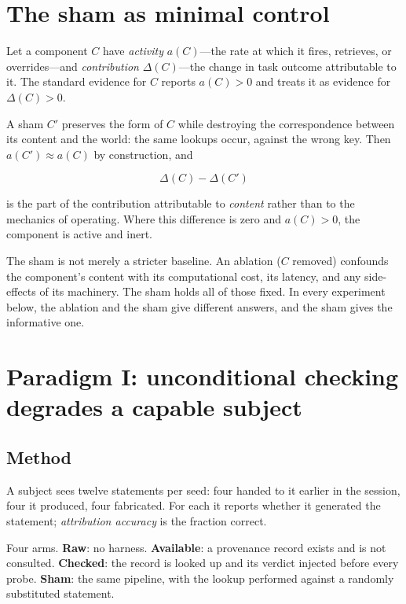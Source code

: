 \documentclass[11pt]{article}
\begin{document}
\section{The sham as minimal control}
\label{sec:sham}

Let a component $C$ have \emph{activity} $a(C)$---the rate at which it fires,
retrieves, or overrides---and \emph{contribution} $\Delta(C)$---the change in
task outcome attributable to it. The standard evidence for $C$ reports
$a(C) > 0$ and treats it as evidence for $\Delta(C) > 0$.

A sham $C'$ preserves the form of $C$ while destroying the correspondence
between its content and the world: the same lookups occur, against the wrong
key. Then $a(C') \approx a(C)$ by construction, and

\[
\Delta(C) - \Delta(C')
\]

is the part of the contribution attributable to \emph{content} rather than to
the mechanics of operating. Where this difference is zero and $a(C) > 0$, the
component is active and inert.

The sham is not merely a stricter baseline. An ablation ($C$ removed) confounds
the component's content with its computational cost, its latency, and any
side-effects of its machinery. The sham holds all of those fixed. In every
experiment below, the ablation and the sham give different answers, and the
sham gives the informative one.

\section{Paradigm I: unconditional checking degrades a capable subject}

\subsection{Method}

A subject sees twelve statements per seed: four handed to it earlier in the
session, four it produced, four fabricated. For each it reports whether it
generated the statement; \emph{attribution accuracy} is the fraction correct.

Four arms. \textbf{Raw}: no harness. \textbf{Available}: a provenance record
exists and is not consulted. \textbf{Checked}: the record is looked up and its
verdict injected before every probe. \textbf{Sham}: the same pipeline, with
the lookup performed against a randomly substituted statement.
\end{document}
